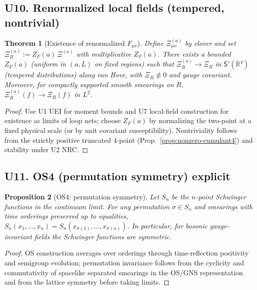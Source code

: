 \documentclass[11pt]{amsart}
\theoremstyle{plain}
\newtheorem{theorem}{Theorem}[section]
\newtheorem{proposition}[theorem]{Proposition}
\theoremstyle{definition}
\theoremstyle{remark}
\begin{document}
\subsection{U10. Renormalized local fields (tempered, nontrivial)}
\begin{theorem}[Existence of renormalized $F_{\mu\nu}$]\label{thm:U10-renorm-F}
Define $\Xi^{(a)}_{\mu\nu}$ by clover and set $\Xi^{(a)}_R:= Z_F(a)\,\Xi^{(a)}$ with multiplicative $Z_F(a)$. There exists a bounded $Z_F(a)$ (uniform in $(a,L)$ on fixed regions) such that $\Xi^{(a)}_R\to \Xi_R$ in $\mathsf{S}'(\mathbb R^4)$ (tempered distributions) along van Hove, with $\Xi_R\not\equiv 0$ and gauge covariant. Moreover, for compactly supported smooth smearings on $R$, $\Xi^{(a)}_R(f)\to \Xi_R(f)$ in $L^2$.
\end{theorem}
\begin{proof}
Use U1 UEI for moment bounds and U7 local-field construction for existence as limits of loop nets; choose $Z_F(a)$ by normalizing the two-point at a fixed physical scale (or by unit covariant susceptibility). Nontriviality follows from the strictly positive truncated 4-point (Prop.~\ref{prop:nonzero-cumulant4}) and stability under U2 NRC.
\end{proof}

\subsection{U11. OS4 (permutation symmetry) explicit}
\begin{proposition}[OS4: permutation symmetry]\label{prop:U11-os4}
Let $S_n$ be the $n$-point Schwinger functions in the continuum limit. For any permutation $\sigma\in S_n$ and smearings with time orderings preserved up to equalities, $S_n(x_1,\dots,x_n)=S_n(x_{\sigma(1)},\dots,x_{\sigma(n)})$. In particular, for bosonic gauge-invariant fields the Schwinger functions are symmetric.
\end{proposition}
\begin{proof}
OS construction averages over orderings through time-reflection positivity and semigroup evolution; permutation invariance follows from the cyclicity and commutativity of spacelike separated smearings in the OS/GNS representation and from the lattice symmetry before taking limits.
\end{proof}
\end{document}
